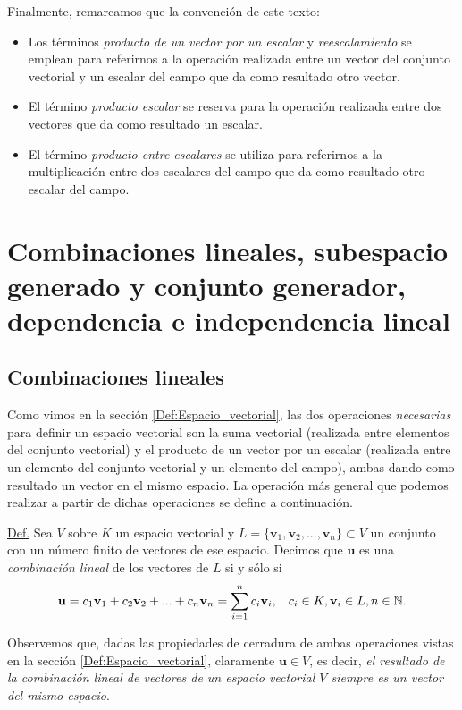 \documentclass[12pt]{article}
\begin{document}
\begin{tcolorbox}
    \hspace{2.5mm} Finalmente, remarcamos que la convención de este texto: 
    \begin{itemize}
        \item Los términos \emph{producto de un vector por un escalar} y \emph{reescalamiento} se emplean para referirnos a la operación realizada entre un vector del conjunto vectorial y un escalar del campo que da como resultado otro vector.
        \item El término \emph{producto escalar} se reserva para la operación realizada entre dos vectores que da como resultado un escalar. 
        \item El término \emph{producto entre escalares} se utiliza para referirnos a la multiplicación entre dos escalares del campo que da como resultado otro escalar del campo.
    \end{itemize}





\end{tcolorbox}


\newpage
\section{Combinaciones lineales, subespacio generado y conjunto generador, dependencia e independencia lineal}

\subsection{Combinaciones lineales} \label{Subsec:Combinaciones_lineales}

Como vimos en la sección \ref{Def:Espacio_vectorial}, las dos operaciones \emph{necesarias} para definir un espacio vectorial son la suma vectorial (realizada entre elementos del conjunto vectorial) y el producto de un vector por un escalar (realizada entre un elemento del conjunto vectorial y un elemento del campo), ambas dando como resultado un vector en el mismo espacio. La operación más general que podemos realizar a partir de dichas operaciones se define a continuación.

\begin{tcolorbox}
    \underline{Def.} Sea $V$ sobre $K$ un espacio vectorial y $L=\{\mathbf{v}_1, \mathbf{v}_2, ..., \mathbf{v}_n\}\subset V$ un conjunto con un número finito de vectores de ese espacio. Decimos que $\mathbf{u}$ es una \emph{combinación lineal} de los vectores de $L$ si y sólo si $$\mathbf{u} =c_1\mathbf{v}_1+c_2\mathbf{v}_2+...+c_n\mathbf{v}_n=\sum_{i=1}^n c_i\mathbf{v}_i,\hspace{3mm}c_i\in K, \mathbf{v}_i\in L, n\in \mathbb{N}.$$

    Observemos que, dadas las propiedades de cerradura de ambas operaciones vistas en la sección \ref{Def:Espacio_vectorial}, claramente $\mathbf{u} \in V$, es decir, \emph{el resultado de la combinación lineal de vectores de un espacio vectorial $V$ siempre es un vector del mismo espacio}. 
\end{tcolorbox}
\end{document}
